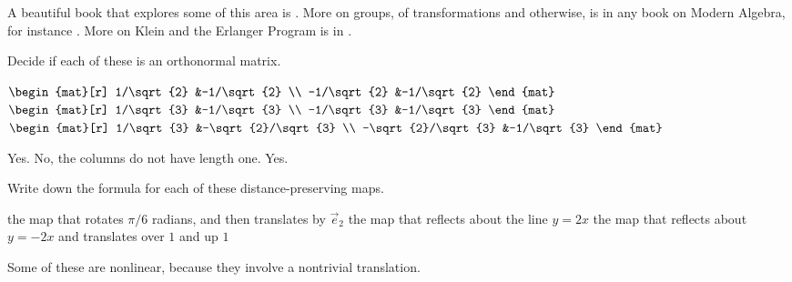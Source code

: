 A beautiful book that explores some of this area is \cite{Weyl}.
More on groups, of transformations and otherwise, is in any book
on Modern Algebra, for instance \cite{BirkhoffMaclane}.
More on Klein and the Erlanger Program is in \cite{Yaglom}.
 

\begin{exercises}
  \item 
    Decide if each of these is an orthonormal matrix.
    \begin{exparts}
      \partsitem $\begin{mat}[r]
                    1/\sqrt{2} &-1/\sqrt{2}  \\
                   -1/\sqrt{2} &-1/\sqrt{2}
                  \end{mat}$
      \partsitem $\begin{mat}[r]
                    1/\sqrt{3} &-1/\sqrt{3}  \\
                   -1/\sqrt{3} &-1/\sqrt{3}
                  \end{mat}$
      \partsitem $\begin{mat}[r]
                    1/\sqrt{3} &-\sqrt{2}/\sqrt{3}  \\
                   -\sqrt{2}/\sqrt{3} &-1/\sqrt{3}
                  \end{mat}$
    \end{exparts}
    \begin{answer}
      \begin{exparts}
        \partsitem Yes.
        \partsitem No, the columns do not have length one.
        \partsitem Yes.
      \end{exparts}
    \end{answer}
  \item 
    Write down the formula for each of these distance-preserving maps.
    \begin{exparts}  
      \partsitem the map that rotates $\pi/6$ radians, and then
        translates by $\vec{e}_2$
      \partsitem the map that reflects about the line $y=2x$
      \partsitem the map that reflects about $y=-2x$ and translates over $1$
        and up $1$
    \end{exparts}
    \begin{answer}
      Some of these are nonlinear, 
      because they involve a nontrivial translation.
\end{answer}
\end{exercises}
